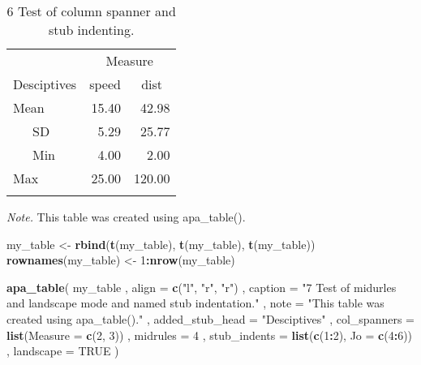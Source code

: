 \documentclass[man]{apa6}
\newenvironment{Shaded}{\begin{snugshade}}{\end{snugshade}}
\newcommand{\KeywordTok}[1]{\textcolor[rgb]{0.13,0.29,0.53}{\textbf{#1}}}
\newcommand{\DataTypeTok}[1]{\textcolor[rgb]{0.13,0.29,0.53}{#1}}
\newcommand{\DecValTok}[1]{\textcolor[rgb]{0.00,0.00,0.81}{#1}}
\newcommand{\StringTok}[1]{\textcolor[rgb]{0.31,0.60,0.02}{#1}}
\newcommand{\OtherTok}[1]{\textcolor[rgb]{0.56,0.35,0.01}{#1}}
\newcommand{\OperatorTok}[1]{\textcolor[rgb]{0.81,0.36,0.00}{\textbf{#1}}}
\newcommand{\NormalTok}[1]{#1}
\begin{document}
\begin{table}[tbp]
\begin{center}
\begin{threeparttable}
\caption{\label{tab:unnamed-chunk-6}6 Test of column spanner and stub indenting.}
\begin{tabular}{lrr}
\toprule
 & \multicolumn{2}{c}{Measure} \\
\cmidrule(r){2-3}
Desciptives & \multicolumn{1}{c}{speed} & \multicolumn{1}{c}{dist}\\
\midrule
Mean & 15.40 & 42.98\\
\ \ \ SD & 5.29 & 25.77\\
\ \ \ Min & 4.00 & 2.00\\
Max & 25.00 & 120.00\\
\bottomrule
\addlinespace
\end{tabular}
\begin{tablenotes}[para]
\normalsize{\textit{Note.} This table was created using apa\_table().}
\end{tablenotes}
\end{threeparttable}
\end{center}
\end{table}

\begin{Shaded}
\begin{Highlighting}[]
\NormalTok{my_table <-}\StringTok{ }\KeywordTok{rbind}\NormalTok{(}\KeywordTok{t}\NormalTok{(my_table), }\KeywordTok{t}\NormalTok{(my_table), }\KeywordTok{t}\NormalTok{(my_table))}
\KeywordTok{rownames}\NormalTok{(my_table) <-}\StringTok{ }\DecValTok{1}\OperatorTok{:}\KeywordTok{nrow}\NormalTok{(my_table)}

\KeywordTok{apa_table}\NormalTok{(}
\NormalTok{  my_table}
\NormalTok{  , }\DataTypeTok{align =} \KeywordTok{c}\NormalTok{(}\StringTok{"l"}\NormalTok{, }\StringTok{"r"}\NormalTok{, }\StringTok{"r"}\NormalTok{)}
\NormalTok{  , }\DataTypeTok{caption =} \StringTok{"7 Test of midurles and landscape mode and named stub indentation."}
\NormalTok{  , }\DataTypeTok{note =} \StringTok{"This table was created using apa_table()."}
\NormalTok{  , }\DataTypeTok{added_stub_head =} \StringTok{"Desciptives"}
\NormalTok{  , }\DataTypeTok{col_spanners =} \KeywordTok{list}\NormalTok{(}\DataTypeTok{Measure =} \KeywordTok{c}\NormalTok{(}\DecValTok{2}\NormalTok{, }\DecValTok{3}\NormalTok{))}
\NormalTok{  , }\DataTypeTok{midrules =} \DecValTok{4}
\NormalTok{  , }\DataTypeTok{stub_indents =} \KeywordTok{list}\NormalTok{(}\KeywordTok{c}\NormalTok{(}\DecValTok{1}\OperatorTok{:}\DecValTok{2}\NormalTok{), }\DataTypeTok{Jo =} \KeywordTok{c}\NormalTok{(}\DecValTok{4}\OperatorTok{:}\DecValTok{6}\NormalTok{))}
\NormalTok{  , }\DataTypeTok{landscape =} \OtherTok{TRUE}
\NormalTok{)}
\end{Highlighting}
\end{Shaded}
\end{document}
